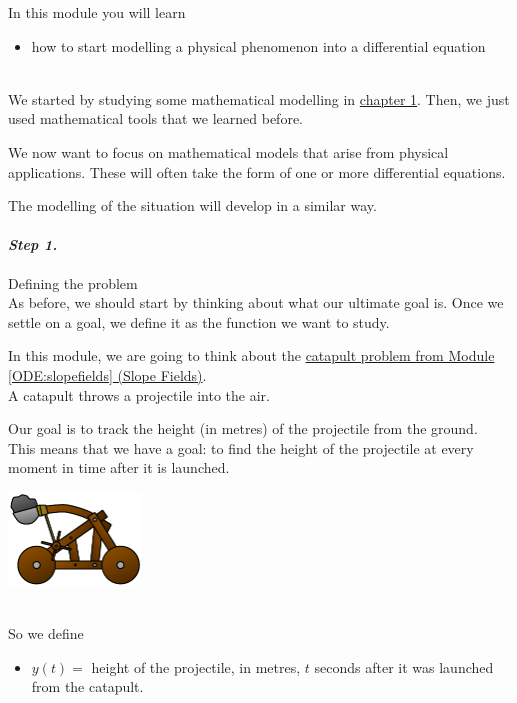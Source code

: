 In this module you will learn
\begin{itemize}
	\item how to start modelling a physical phenomenon into a differential equation
\end{itemize}

\hfill \\


We started by studying some mathematical modelling in \hyperref[chap1]{chapter 1}. Then, we just used mathematical tools that we learned before. 

We now want to focus on mathematical models that arise from physical applications. These will often take the form of one or more differential equations.

The modelling of the situation will develop in a similar way.


\paragraph{\emph{Step 1.}} Defining the problem \\

As before, we should start by thinking about what our ultimate goal is. 
Once we settle on a goal, we define it as the function we want to study.

\begin{example}

\begin{minipage}{.7\textwidth}
In this module, we are going to think about the \hyperref[ODE:slopefields]{catapult problem from Module \ref{ODE:slopefields} (Slope Fields)}. \\

A catapult throws a projectile into the air.

Our goal is to track the height (in metres) of the projectile from the ground.\\

This means that we have a goal: to find the height of the projectile at every moment in time after it is launched.
\end{minipage}\hfill
\begin{minipage}{100pt}
	\includegraphics*[width=100pt]{images/module9-catapult.pdf}	
\end{minipage}
\hfill \\[10pt]

So we define
\begin{itemize}
	\item $y(t) = $ height of the projectile, in metres, $t$ seconds after it was launched from the catapult.
\end{itemize}

\end{example}

